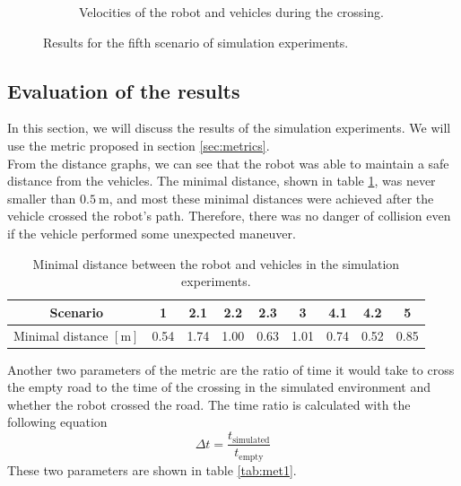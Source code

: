 \begin{figure}[H]
\begin{subfigure}{0.49\linewidth}
                    \caption{Velocities of the robot and vehicles during the crossing.}
                    \label{fig:scene5_vel}
                \end{subfigure}
                \caption{Results for the fifth scenario of simulation experiments.}
                \label{fig:scene5_graphs}
            \end{figure}
    \subsection{Evaluation of the results}
        In this section, we will discuss the results of the simulation experiments. We will use the metric proposed in section \ref{sec:metrics}.\\
        From the distance graphs, we can see that the robot was able to maintain a safe distance from the vehicles. The minimal distance, shown in table \ref{tab:dist}, was never smaller than $0.5\:\si{\m}$, and most these minimal distances were achieved after the vehicle crossed the robot's path. Therefore, there was no danger of collision even if the vehicle performed some unexpected maneuver.\\
        \begin{table}[H]
            \centering
            \begin{tabular}{|c||c|c|c|c|c|c|c|c|}
                \hline
                Scenario & 1 & 2.1 & 2.2 & 2.3 & 3 & 4.1 & 4.2 & 5 \\
                \hline
                Minimal distance $[\si{\m}]$ & 0.54 & 1.74 & 1.00 & 0.63 & 1.01 & 0.74 & 0.52 & 0.85 \\
                \hline
            \end{tabular}
            \caption{Minimal distance between the robot and vehicles in the simulation experiments.}
            \label{tab:dist}
        \end{table}
        Another two parameters of the metric are the ratio of time it would take to cross the empty road to the time of the crossing in the simulated environment and whether the robot crossed the road. The time ratio is calculated with the following equation
        \begin{equation}
            \Delta t = \frac{t_{\text{simulated}}}{t_{\text{empty}}}
        \end{equation}
        \noindent These two parameters are shown in table \ref{tab:met1}.
